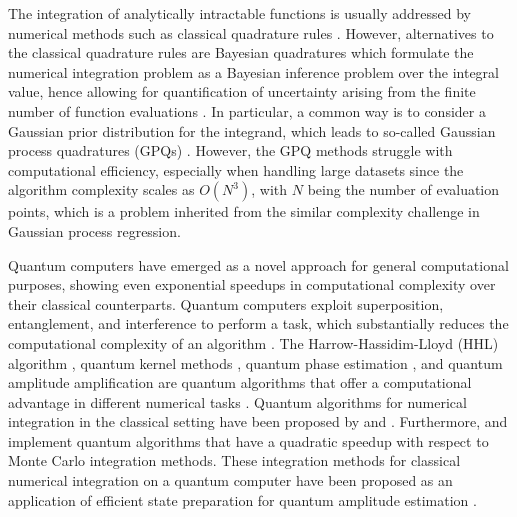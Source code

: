 \documentclass[10pt]{article}
\begin{document}
	The integration of analytically intractable functions is usually addressed by numerical methods such as classical quadrature rules \citep{Philip1986NumericalIntegration}. However, alternatives to the classical quadrature rules are Bayesian quadratures which formulate the numerical integration problem as a Bayesian inference problem over the integral value, hence allowing for quantification of uncertainty arising from the finite number of function evaluations \citep{Hagan1991BHQuadrature, Minka2000QuadraturesGPR, Hennig2022ProbabilisticNumerics}. In particular, a common way is to consider a Gaussian prior distribution for the integrand, which leads to so-called Gaussian process quadratures (GPQs) \citep{Minka2000QuadraturesGPR, Hennig2022ProbabilisticNumerics}. However, the GPQ methods struggle with computational efficiency, especially when handling large datasets since the algorithm complexity scales as $O(N^3)$, with $N$ being the number of evaluation points, which is a problem inherited from the similar complexity challenge in Gaussian process regression.
	
	Quantum computers have emerged as a novel approach for general computational purposes, showing even exponential speedups in computational complexity over their classical counterparts.
	Quantum computers exploit superposition, entanglement, and interference to perform a task, which substantially reduces the computational complexity of an algorithm \citep{Nielsen2011QuantumComputing}.
	The Harrow-Hassidim-Lloyd (HHL) algorithm \citep{Harrow2009HHLalgorithm}, quantum kernel methods \citep{schuld2019quantum}, quantum phase estimation \citep[QPE,][]{kitaev1995QPE}, and quantum amplitude amplification \citep[QAA,][]{Brassard2002QAA} are quantum algorithms that offer a computational advantage in different numerical tasks \citep{Schuld2016QLinearRegresion, Shor1994ShorAlgorithm, Grover1996GroverAlgorithm, wiedemann2023quantum,canatar2023bandwidth}. Quantum algorithms for numerical integration in the classical setting have been proposed by \citet{Yu2020PracticalIntegrationNISQ} and \citet{ Shu2024GeneralQAforIntegration}. Furthermore, \citet{Vazquez2021EfficientQAE} and \citet{Martinez2023QFIterativeAmplitude} implement quantum algorithms that have a quadratic speedup with respect to Monte Carlo integration methods. These integration methods for classical numerical integration on a quantum computer have been proposed as an application of efficient state preparation for quantum amplitude estimation \citep{Martinez2023QFIterativeAmplitude}.
	
\end{document}
